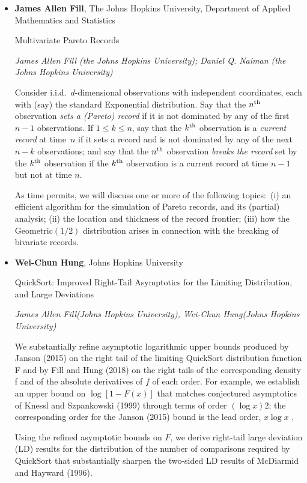 \begin{itemize}
\item \textbf{James Allen Fill}, The Johns Hopkins University, Department of Applied Mathematics and Statistics

Multivariate Pareto Records

\emph{\footnotesize James Allen Fill (the Johns Hopkins University); Daniel Q. Naiman (the Johns Hopkins University)}

Consider i.i.d.\ $d$-dimensional observations with independent coordinates, each with (say) the standard Exponential distribution.  Say that the $n^{\rm \scriptsize th}$ observation \emph{sets a (Pareto) record} if it is not dominated by any of the first $n - 1$ observations.  If $1 \leq k \leq n$, say that the 
$k^{\rm \scriptsize th}$ observation is a \emph{current record} at time~$n$ if it sets a record and is not dominated by any of the next $n - k$ observations; and say that the $n^{\rm \scriptsize th}$ observation \emph{breaks the record} set by the $k^{\rm \scriptsize th}$ observation if the $k^{\rm \scriptsize th}$ observation is a current record at time $n - 1$ but not at time $n$.

As time permits, we will discuss one or more of the following topics:\ (i) an efficient algorithm for the simulation of Pareto records, and its (partial) analysis; (ii) the location and thickness of the record frontier; (iii) how the Geometric$(1/2)$ distribution arises in connection with the breaking of bivariate records.

\item \textbf{Wei-Chun Hung}, Johns Hopkins University

QuickSort: Improved Right-Tail Asymptotics for the Limiting Distribution, and Large Deviations

\emph{\footnotesize James Allen Fill(Johns Hopkins University), Wei-Chun Hung(Johns Hopkins University)}

We substantially refine asymptotic logarithmic upper bounds produced by Janson (2015) on the right tail of the limiting QuickSort distribution function F and by Fill and Hung (2018) on the right tails of the corresponding density f and of the absolute derivatives of $f$ of each order. For example, we establish an upper bound on $\log[1-F(x)]$ that matches conjectured asymptotics of Knessl and Szpankowski (1999) through terms of order $(\log x)2$; the corresponding order for the Janson (2015) bound is the lead order, $x \log x$ .

Using the refined asymptotic bounds on $F$, we derive right-tail large deviation (LD) results for the distribution of the number of comparisons required by QuickSort that substantially sharpen the two-sided LD results of McDiarmid and Hayward (1996).


\end{itemize}
